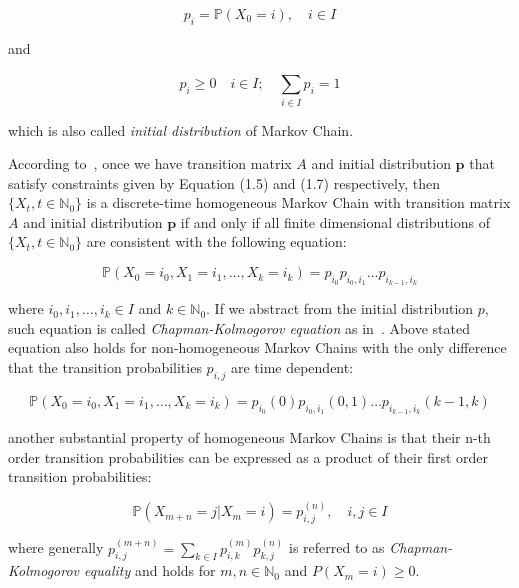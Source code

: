 \begin{equation}
p_i = \mathbb{P}(X_0=i), \quad i \in I
\end{equation}

and 

\begin{equation}
p_i \geq 0 \quad i \in I; \quad \sum\limits_{i \in I} ^{}p_i = 1
\end{equation}

which is also called \textit{initial distribution} of Markov Chain.

According to~\cite{Praskova2012}, once we have transition matrix $A$ and initial distribution $\textbf{p}$ that satisfy constraints given by Equation (1.5) and (1.7) respectively,
then $\{X_t,t \in \mathbb{N}_0\}$ is a discrete-time homogeneous Markov Chain with transition matrix $A$ and initial distribution $\textbf{p}$ 
if and only if all finite dimensional distributions of $\{X_t,t \in \mathbb{N}_0\}$ are consistent with the following equation:

\begin{equation}
    \mathbb{P}(X_{0}=i_0,X_{1}=i_1,\ldots,X_{k}=i_k) = p_{i_0} p_{i_0,i_1} \ldots p_{i_{k-1},i_k}
\end{equation}

where $i_0,i_1,\ldots,i_k \in I$ and $k \in \mathbb{N}_0$. If we abstract from the initial distribution $p$, such equation is called \textit{Chapman-Kolmogorov equation} as in~\cite{Yin2004}.
Above stated equation also holds for non-homogeneous Markov Chains with the only difference that the transition probabilities $p_{i,j}$ are time dependent:

\begin{equation}
    \mathbb{P}(X_{0}=i_0,X_{1}=i_1,\ldots,X_{k}=i_k) = p_{i_0}(0) p_{i_0,i_1}(0,1) \ldots p_{i_{k-1},i_k}(k-1,k)
\end{equation}

another substantial property of homogeneous Markov Chains is that their n-th order transition probabilities can be expressed as a product of their first order transition probabilities:

\begin{equation}
    \mathbb{P}(X_{m+n} = j|X_{m} = i) = p_{i,j}^{(n)}, \quad i,j \in I
\end{equation}

where generally $p_{i,j}^{(m+n)} = \sum\limits_{k \in I} p_{i,k}^{(m)} p_{k,j}^{(n)}$ is referred to as \textit{Chapman-Kolmogorov equality} and holds for $m,n \in \mathbb{N}_0$ and $P(X_m=i) \geq 0$. \cite{Praskova2012}

